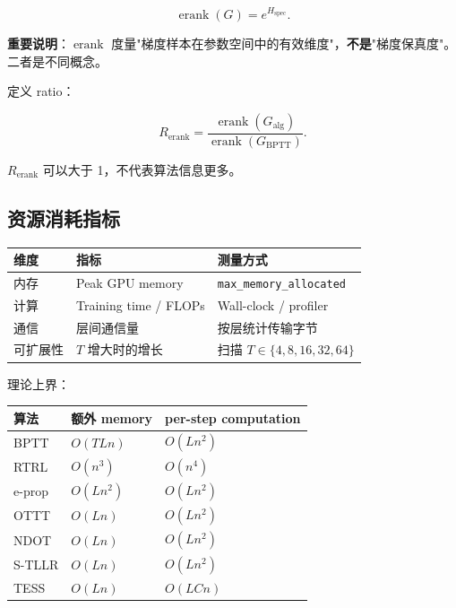 \documentclass[journal,12pt,onecolumn]{IEEEtran}
\begin{document}
\begin{equation}
\operatorname{erank}(G)=e^{H_{\mathrm{spec}}}.
\end{equation}

\textbf{重要说明}：$\operatorname{erank}$ 度量"梯度样本在参数空间中的有效维度"，\textbf{不是}"梯度保真度"。二者是不同概念。

定义 ratio：

\begin{equation}
R_{\mathrm{erank}}=\frac{\operatorname{erank}(G_{\mathrm{alg}})}{\operatorname{erank}(G_{\mathrm{BPTT}})}.
\end{equation}

$R_{\mathrm{erank}}$ 可以大于 1，不代表算法信息更多。

\subsection{资源消耗指标}

\begin{center}
\begin{tabular}{lll}
\toprule
维度 & 指标 & 测量方式 \\
\midrule
内存 & Peak GPU memory & \texttt{max\_memory\_allocated} \\
计算 & Training time / FLOPs & Wall-clock / profiler \\
通信 & 层间通信量 & 按层统计传输字节 \\
可扩展性 & $T$ 增大时的增长 & 扫描 $T\in\{4,8,16,32,64\}$ \\
\bottomrule
\end{tabular}
\end{center}

理论上界：

\begin{center}
\begin{tabular}{lll}
\toprule
算法 & 额外 memory & per-step computation \\
\midrule
BPTT        & $O(TLn)$              & $O(Ln^2)$ \\
RTRL        & $O(n^3)$              & $O(n^4)$ \\
e-prop      & $O(Ln^2)$             & $O(Ln^2)$ \\
OTTT        & $O(Ln)$               & $O(Ln^2)$ \\
NDOT        & $O(Ln)$               & $O(Ln^2)$ \\
S-TLLR      & $O(Ln)$               & $O(Ln^2)$ \\
TESS        & $O(Ln)$               & $O(LCn)$ \\
\bottomrule
\end{tabular}
\end{center}
\end{document}
